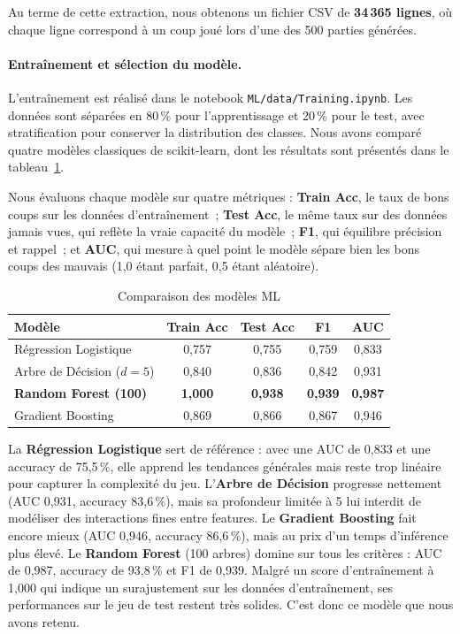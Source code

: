 \documentclass[a4paper]{article}
\begin{document}
Au terme de cette extraction, nous obtenons un fichier CSV de
\textbf{34\,365 lignes}, où chaque ligne correspond à un coup joué lors
d'une des 500 parties générées.

\paragraph{Entraînement et sélection du modèle.}
L'entraînement est réalisé dans le notebook \texttt{ML/data/Training.ipynb}.
Les données sont séparées en 80\,\% pour l'apprentissage et 20\,\% pour
le test, avec stratification pour conserver la distribution des classes.
Nous avons comparé quatre modèles classiques de scikit-learn, dont les
résultats sont présentés dans le tableau~\ref{tab:ml-comparison}.

\medskip
Nous évaluons chaque modèle sur quatre métriques : \textbf{Train Acc},
le taux de bons coups sur les données d'entraînement~; \textbf{Test Acc},
le même taux sur des données jamais vues, qui reflète la vraie capacité du
modèle~; \textbf{F1}, qui équilibre précision et rappel~; et \textbf{AUC},
qui mesure à quel point le modèle sépare bien les bons coups des mauvais
(1,0 étant parfait, 0,5 étant aléatoire).
\medskip

\begin{table}[H]
  \centering
  \begin{tabular}{lcccc}
    \hline
    \textbf{Modèle} & \textbf{Train Acc} & \textbf{Test Acc} &
      \textbf{F1} & \textbf{AUC} \\
    \hline
    Régression Logistique       & 0,757 & 0,755 & 0,759 & 0,833 \\
    Arbre de Décision ($d{=}5$) & 0,840 & 0,836 & 0,842 & 0,931 \\
    \textbf{Random Forest (100)} & \textbf{1,000} & \textbf{0,938} &
      \textbf{0,939} & \textbf{0,987} \\
    Gradient Boosting           & 0,869 & 0,866 & 0,867 & 0,946 \\
    \hline
  \end{tabular}
  \caption{Comparaison des modèles ML}
  \label{tab:ml-comparison}
\end{table}

La \textbf{Régression Logistique} sert de référence : avec une AUC de 0,833
et une accuracy de 75,5\,\%, elle apprend les tendances générales mais reste
trop linéaire pour capturer la complexité du jeu. L'\textbf{Arbre de Décision}
progresse nettement (AUC 0,931, accuracy 83,6\,\%), mais sa profondeur limitée
à 5 lui interdit de modéliser des interactions fines entre features. Le
\textbf{Gradient Boosting} fait encore mieux (AUC 0,946, accuracy 86,6\,\%),
mais au prix d'un temps d'inférence plus élevé. Le \textbf{Random Forest}
(100 arbres) domine sur tous les critères : AUC de 0,987, accuracy de 93,8\,\%
et F1 de 0,939. Malgré un score d'entraînement à 1,000 qui indique un
surajustement sur les données d'entraînement, ses performances sur le jeu de
test restent très solides. C'est donc ce modèle que nous avons retenu.
\end{document}
